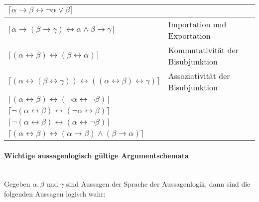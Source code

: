 \documentclass{scrartcl}
\begin{document}
\begin{tabularx}{\linewidth}{l|l}
	\hline
	$ \lceil \alpha \rightarrow \beta \leftrightarrow \neg \alpha \vee \beta \rceil $ &  \\
	\hline
	$ \lceil \alpha \rightarrow (\beta \rightarrow \gamma) \leftrightarrow \alpha \wedge \beta \rightarrow \gamma \rceil $ & Importation und Exportation \\
	\hline
	$ \lceil (\alpha \leftrightarrow \beta) \leftrightarrow (\beta \leftrightarrow \alpha) \rceil $ & Kommutativität der Bisubjunktion \\
	\hline
	$ \lceil (\alpha \leftrightarrow (\beta \leftrightarrow \gamma)) \leftrightarrow ((\alpha \leftrightarrow \beta) \leftrightarrow \gamma) \rceil $ & Assoziativität der Bisubjunktion \\
	\hline
	$ \lceil (\alpha \leftrightarrow \beta) \leftrightarrow (\neg \alpha \leftrightarrow \neg \beta) \rceil $ &  \\
	\hline
	$ \lceil \neg (\alpha \leftrightarrow \beta) \leftrightarrow (\neg \alpha \leftrightarrow \beta) \rceil $ &  \\
	\hline
	$ \lceil \neg (\alpha \leftrightarrow \beta) \leftrightarrow (\alpha \leftrightarrow \neg \beta) \rceil $ &  \\
	\hline
	$ \lceil (\alpha \leftrightarrow \beta) \leftrightarrow (\alpha \rightarrow \beta) \wedge (\beta \rightarrow \alpha) \rceil $ &  \\
\end{tabularx}

\pagebreak
\paragraph{Wichtige aussagenlogisch gültige Argumentschemata} \mbox{}\\

Gegeben $ \alpha, \beta $ und $ \gamma $ sind Aussagen der Sprache der Aussagenlogik, dann sind die folgenden Aussagen logisch wahr: \\
\end{document}
